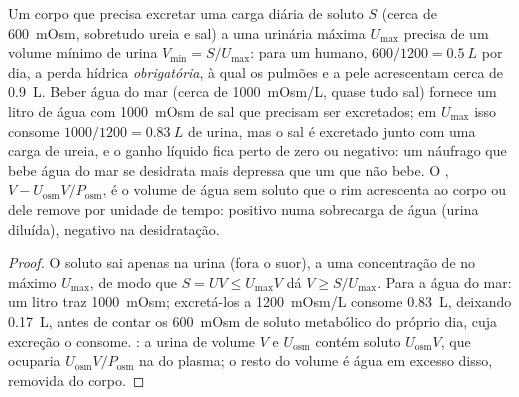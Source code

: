\begin{proposition}\label{prop:b3:renal-osmoregulation:water}
Um corpo que precisa excretar uma carga diária de soluto $S$ (cerca de
\qty{600}{mOsm}, sobretudo ureia e sal) a uma  urinária
máxima $U_{\max}$ precisa de um volume mínimo de urina $V_{\min} = S/U_{\max}$: para um humano, $600/1200 = \qty{0.5}{L}$ por dia, a perda
hídrica \emph{obrigatória}, à qual os pulmões e a pele acrescentam cerca
de \qty{0.9}{L}. Beber água do mar (cerca de \qty{1000}{mOsm/L}, quase
tudo sal) fornece um litro de água com \qty{1000}{mOsm} de sal que
precisam ser excretados; em $U_{\max}$ isso consome $1000/1200 = \qty{0.83}{L}$ de urina, mas o sal é excretado junto com uma carga de
ureia, e o ganho líquido fica perto de zero ou negativo: um náufrago que
bebe água do mar se desidrata mais depressa que um que não bebe. O
\emph{}, $V - U_{\text{osm}}V/P_{\text{osm}}$, é o
volume de água sem soluto que o rim acrescenta ao corpo ou dele remove
por unidade de tempo: positivo numa sobrecarga de água (urina diluída),
negativo na desidratação.
\end{proposition}
\begin{proof}
O soluto sai apenas na urina (fora o suor), a uma concentração de no
máximo $U_{\max}$, de modo que $S = U V \le U_{\max}V$ dá $V \ge S/U_{\max}$. Para a água do mar: um litro traz \qty{1000}{mOsm};
excretá-los a \qty{1200}{mOsm/L} consome \qty{0.83}{L}, deixando
\qty{0.17}{L}, antes de contar os \qty{600}{mOsm} de soluto metabólico
do próprio dia, cuja excreção o consome. : a
urina de volume $V$ e  $U_{\text{osm}}$ contém soluto
$U_{\text{osm}}V$, que ocuparia $U_{\text{osm}}V/P_{\text{osm}}$ na
 do plasma; o resto do volume é água em excesso disso,
removida do corpo.
\end{proof}

